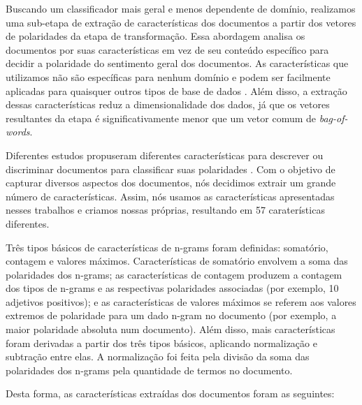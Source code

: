 \documentclass[template.tex]{subfiles}
\begin{document}
Buscando um classificador mais geral e menos dependente de domínio, realizamos uma sub-etapa de extração de características dos documentos a partir dos vetores de polaridades da etapa de transformação. Essa abordagem analisa os documentos por suas características em vez de seu conteúdo específico para decidir a polaridade do sentimento geral dos documentos. As características que utilizamos não são específicas para nenhum domínio e podem ser facilmente aplicadas para quaisquer outros tipos de base de dados \cite{pang2002thumbs}. Além disso, a extração dessas características reduz a dimensionalidade dos dados, já que os vetores resultantes da etapa é significativamente menor que um vetor comum de \textit{bag-of-words}.

Diferentes estudos propuseram diferentes características para descrever ou discriminar documentos para classificar suas polaridades \cite{wilson2005recognizing, ohana2009sentiment, taboada2011lexicon}. Com o objetivo de capturar diversos aspectos dos documentos, nós decidimos extrair um grande número de características. Assim, nós usamos as características apresentadas nesses trabalhos e criamos nossas próprias, resultando em 57 caraterísticas diferentes.

Três tipos básicos de características de n-grams foram definidas: somatório, contagem e valores máximos. Características de somatório envolvem a soma das polaridades dos n-grams; as características de contagem produzem a contagem dos tipos de n-grams e as respectivas polaridades associadas (por exemplo, 10 adjetivos positivos); e as características de valores máximos se referem aos valores extremos de polaridade para um dado n-gram no documento (por exemplo, a maior polaridade absoluta num documento). Além disso, mais características foram derivadas a partir dos três tipos básicos, aplicando normalização e subtração entre elas. A normalização foi feita pela divisão da soma das polaridades dos n-grams pela quantidade de termos no documento.

Desta forma, as características extraídas dos documentos foram as seguintes:
\end{document}
